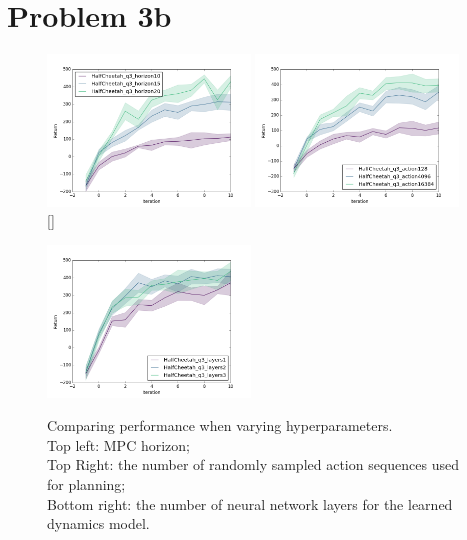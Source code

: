 \documentclass[12pt]{article}
\begin{document}
  \section{Problem 3b}
  \begin{figure}[!htbp]
  	\includegraphics[width=0.48\textwidth]{HalfCheetah_q3_mpc_horizon.png}
  	\includegraphics[width=0.48\textwidth]{HalfCheetah_q3_actions.png}
  	[\FBwidth]
  	{\caption[caption]{
  		Comparing performance when varying hyperparameters. \\ \hspace{0.4\textwidth}
  		Top left: MPC horizon; \\ \hspace{0.4\textwidth}
  		Top Right: the number of randomly sampled action sequences used for planning; \\ \hspace{0.4\textwidth}
  		Bottom right: the number of neural network layers for the learned dynamics model.
  		}}
  	{\includegraphics[width=0.48\textwidth]{HalfCheetah_q3_nn_layers.png}}
  	\label{fig:q3b}
  \end{figure}
\end{document}
